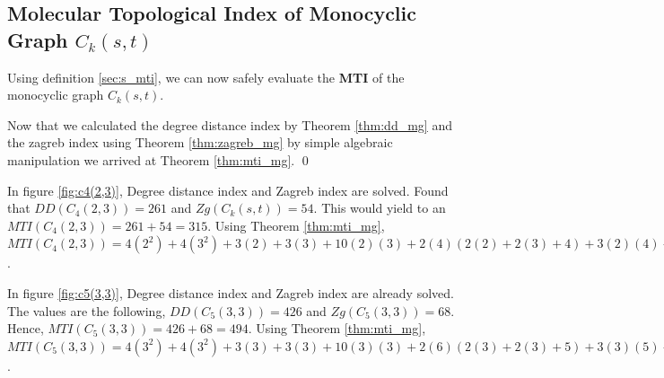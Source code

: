\begin{e.g.}
\section{Molecular Topological Index of Monocyclic Graph $C_k(s,t)$}

\proof
Using definition \href{chap2.tex}{\ref{sec:s_mti}}, we can now safely evaluate the \textbf{MTI} of the monocyclic graph $C_k(s,t)$.

Now that we calculated the degree distance index by Theorem \ref{thm:dd_mg} and the zagreb index using Theorem \ref{thm:zagreb_mg} by simple algebraic manipulation we arrived at Theorem \ref{thm:mti_mg}.
\qed

\begin{e.g.}\rm
In figure \ref{fig:c4(2,3)}, Degree distance index and Zagreb index are solved. Found that $DD(C_4(2,3))=261$ and $Zg(C_k(s,t))=54$. This would yield to an $MTI(C_4(2,3))=261+54=315$. Using Theorem \ref{thm:mti_mg}, $MTI(C_4(2,3))=4(2^2)+4(3^2)+3(2)+3(3)+10(2)(3)+2(4)(2(2)+2(3)+4)+3(2)(4)+3(4)(3)+4(4)=315$.
\end{e.g.}

\begin{e.g.}\rm
In figure \ref{fig:c5(3,3)}, Degree distance index and Zagreb index are already solved. The values are the following, $DD(C_5(3,3))=426$ and $Zg(C_5(3,3))=68$. Hence, $MTI(C_5(3,3))=426+68=494$. Using Theorem \ref{thm:mti_mg}, $MTI(C_5(3,3))=4(3^2)+4(3^2)+3(3)+3(3)+10(3)(3)+2(6)(2(3)+2(3)+5)+3(3)(5)+3(5)(3)+4(5)=494$.
\end{e.g.}


\end{e.g.}
